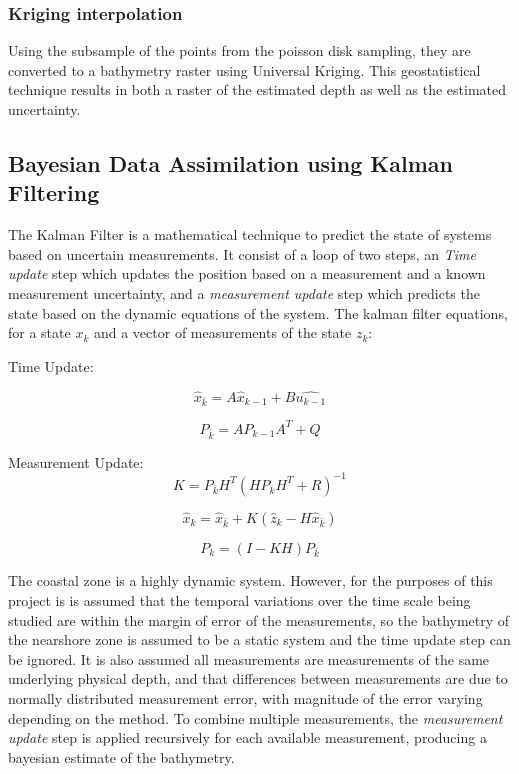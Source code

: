 \subsubsection{Kriging interpolation}
Using the subsample of the points from the poisson disk sampling, they are converted to a bathymetry raster using Universal Kriging. This geostatistical technique results in both a raster of the estimated depth as well as the estimated uncertainty. 


\subsection{Bayesian Data Assimilation using Kalman Filtering}
The Kalman Filter is a mathematical technique to predict the state of systems based on uncertain measurements. It consist of a loop of two steps, an \emph{Time update} step which updates the position based on a measurement and a known measurement uncertainty, and a \emph{measurement update} step which predicts the state based on the dynamic equations of the system. The kalman filter equations, for a state $x_k$ and a vector of measurements of the state $z_k$:

Time Update:

\begin{equation}
    \hat{x}_{\bar{k}} = A\hat{x}_{k-1} + B\hat{u_{k-1}}
\end{equation}

\begin{equation}
    P_{\bar{k}} = A P_{k-1} A^T + Q
\end{equation}

Measurement Update:
\begin{equation}
    K = P_{\bar{k}} H^T(H P_{\bar{k}} H^T + R) ^{-1}
\end{equation}

\begin{equation}
    \hat{x}_k = \hat{x}_{\bar{k}} + K(\hat{z}_k - H \hat{x}_{\bar{k}})
\end{equation}

\begin{equation}
    P_k = (I - KH)P_{\bar{k}}
\end{equation}


The coastal zone is a highly dynamic system. However, for the purposes of this project is is assumed that the temporal variations over the time scale being studied are within the margin of error of the measurements, so the bathymetry of the nearshore zone is assumed to be a static system and the time update step can be ignored. It is also assumed all measurements are measurements of the same underlying physical depth, and that differences between measurements are due to normally distributed measurement error, with magnitude of the error varying depending on the method. To combine multiple measurements, the \emph{measurement update} step is applied recursively for each available measurement, producing a bayesian estimate of the bathymetry.  

